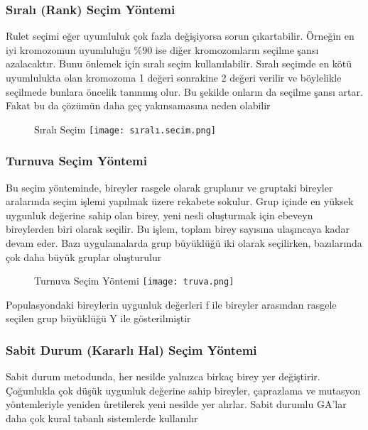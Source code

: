 \documentclass[12pt, a4paper]{article}
\begin{document}
\begin{flushleft}
	\newpage
		\subsubsection{Sıralı (Rank) Seçim Yöntemi}
	Rulet seçimi eğer uyumluluk çok fazla değişiyorsa sorun çıkartabilir. Örneğin 
	en iyi kromozomun uyumluluğu \%90 ise diğer kromozomların seçilme şansı 
	azalacaktır. Bunu önlemek için sıralı seçim kullanılabilir. Sıralı seçimde en kötü 
	uyumlulukta olan kromozoma 1 değeri sonrakine 2 değeri verilir ve böylelikle 
	seçilmede bunlara öncelik tanınmış olur. Bu şekilde onların da seçilme şansı artar. 
	Fakat bu da çözümün daha geç yakınsamasına neden olabilir\cite{holland1992adaptation}
	
	\begin{figure}[h]
		\item {Sıralı Seçim}
		\centering
		\texttt{[image: sıralı.secim.png]}
		\\[20pt]
	\end{figure}
	
	\newpage
	\subsubsection{ Turnuva Seçim Yöntemi}
	
	Bu seçim yönteminde, bireyler rasgele olarak gruplanır ve gruptaki bireyler 
	aralarında seçim işlemi yapılmak üzere rekabete sokulur. Grup içinde en yüksek 
	uygunluk değerine sahip olan birey, yeni nesli oluşturmak için ebeveyn bireylerden 
	biri olarak seçilir. Bu işlem, toplam birey sayısına ulaşıncaya kadar devam eder. Bazı 
	uygulamalarda grup büyüklüğü iki olarak seçilirken, bazılarında çok daha büyük 
	gruplar oluşturulur \cite{elen2011ccizelgeleme}
	
	\begin{figure}[h]
		\item {Turnuva Seçim Yöntemi}
		\centering
		\texttt{[image: truva.png]}
		
	\end{figure}
	\item {Populasyondaki bireylerin uygunluk değerleri f ile bireyler arasından rasgele seçilen grup büyüklüğü 
		Y ile gösterilmiştir}
	
	
	
	\subsubsection{ Sabit Durum (Kararlı Hal) Seçim Yöntemi}
	Sabit durum metodunda, her nesilde yalnızca birkaç birey yer değiştirir. 
	Çoğunlukla çok düşük uygunluk değerine sahip bireyler, çaprazlama ve mutasyon 
	yöntemleriyle yeniden üretilerek yeni nesilde yer alırlar. Sabit durumlu GA’lar daha 
	çok kural tabanlı sistemlerde kullanılır
	

\end{flushleft}
\end{document}
